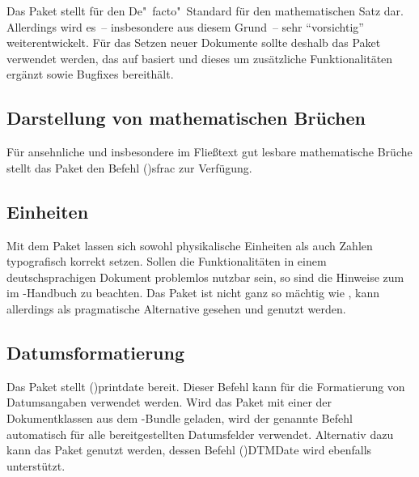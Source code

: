 \documentclass[%
  english,ngerman,%
  cdgeometry=no,DIV=12,%
  cd=false,cdfont=false,cdtitle=true,%
  headings=normal,%
  automark,%
  listof=toc,%
]{tudscrartcl}
\begin{document}
Das Paket  stellt für  den 
De"~facto"~Standard für den mathematischen Satz dar. Allerdings wird es~-- 
insbesondere aus diesem Grund~-- sehr \enquote{vorsichtig} weiterentwickelt. 
Für das Setzen neuer Dokumente sollte deshalb das Paket  
verwendet werden, das auf  basiert und dieses um zusätzliche 
Funktionalitäten ergänzt sowie Bugfixes bereithält.



\subsection{Darstellung von mathematischen Brüchen}

Für ansehnliche und insbesondere im Fließtext gut lesbare mathematische Brüche 
stellt das Paket  den Befehl \Macro(){sfrac} zur 
Verfügung.
%
\begin{Preamble}
\usepackage{xfrac}

\end{Preamble}



\subsection{Einheiten}

Mit dem Paket  lassen sich sowohl physikalische Einheiten als 
auch Zahlen typografisch korrekt setzen. Sollen die Funktionalitäten in einem 
deutschsprachigen Dokument problemlos nutzbar sein, so sind die Hinweise zum 
 im 
\TUDScript-Handbuch zu beachten. Das Paket  ist nicht ganz so 
mächtig wie , kann allerdings als pragmatische Alternative 
gesehen und genutzt werden.



\subsection{Datumsformatierung}

Das Paket  stellt \Macro(){printdate} bereit. 
Dieser Befehl kann für die Formatierung von Datumsangaben verwendet werden. 
Wird das Paket mit einer der Dokumentklassen aus dem \TUDScript-Bundle geladen, 
wird der genannte Befehl automatisch für alle bereitgestellten Datumsfelder 
verwendet. Alternativ dazu kann das Paket  genutzt werden, 
dessen Befehl \Macro(){DTMDate} wird ebenfalls unterstützt.
%
\begin{Preamble}
\usepackage{isodate}

\end{Preamble}
\end{document}
